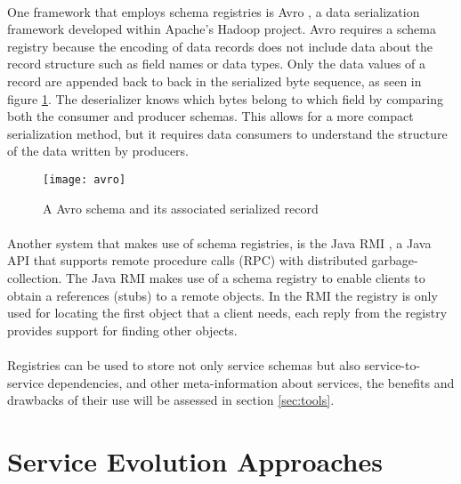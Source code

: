 \paragraph{}

One framework that employs schema registries is Avro \cite{8}, a data serialization framework developed within Apache's Hadoop project.
Avro requires a schema registry because the encoding of data records does not include data about the record structure such as field names or data types.
Only the data values of a record are appended back to back in the serialized byte sequence, as seen in figure \ref{fig:avro}.
The deserializer knows which bytes belong to which field by comparing both the consumer and producer schemas.
This allows for a more compact serialization method, but it requires data consumers to understand the structure of the data written by producers.

\begin{figure}[htbp]
    \centering
    \texttt{[image: avro]}
    \caption{A Avro schema and its associated serialized record }
    \label{fig:avro}
\end{figure}

\paragraph{}

Another system that makes use of schema registries, is the Java RMI \cite{12},
a Java API that supports remote procedure calls (RPC) with distributed garbage-collection.
The Java RMI makes use of a schema registry to enable clients to obtain a references (stubs) to a remote objects.
In the RMI the registry is only used for locating the first object that a client needs, each reply from the registry provides
support for finding other objects.

\paragraph{}

Registries can be used to store not only service schemas but also service-to-service dependencies, and other meta-information about services, the benefits and drawbacks of their use will be
assessed in section \ref{sec:tools}.

\section{Service Evolution Approaches} %
\label{sec:service_evolution_approaches}


